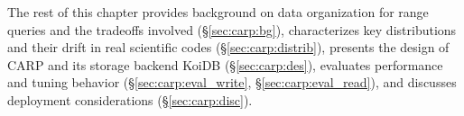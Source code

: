 The rest of this chapter provides background on data organization for range queries and the
tradeoffs involved (\S\ref{sec:carp:bg}), characterizes key distributions and their drift in real
scientific codes (\S\ref{sec:carp:distrib}), presents the design of CARP and its storage backend
KoiDB (\S\ref{sec:carp:des}), evaluates performance and tuning behavior
(\S\ref{sec:carp:eval_write},
\S\ref{sec:carp:eval_read}), and discusses deployment considerations
(\S\ref{sec:carp:disc}).

